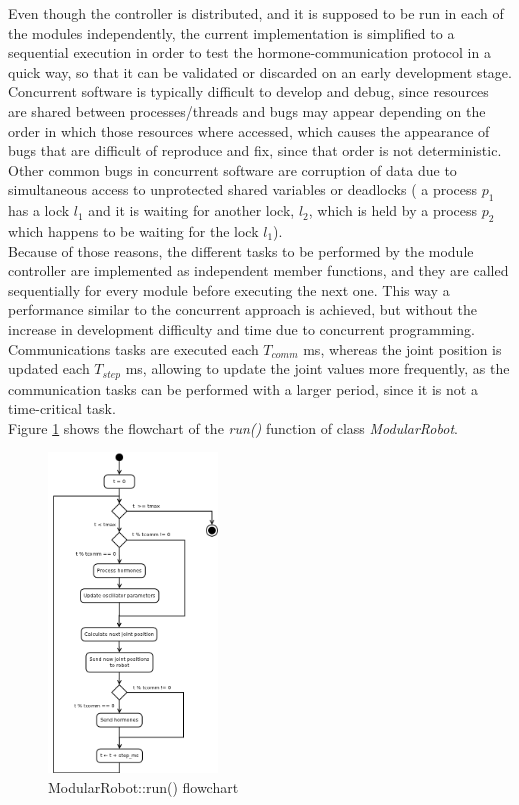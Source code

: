 Even though the controller is distributed, and it is supposed to be run in each of the modules independently, the current implementation is simplified to a sequential execution in order to test the hormone-communication protocol in a quick way, so that it can be validated or discarded on an early development stage. Concurrent software is typically difficult to develop and debug, since resources are shared between processes/threads and bugs may appear depending on the order in which those resources where accessed, which causes the appearance of bugs that are difficult of reproduce and fix, since that order is not deterministic. Other common bugs in concurrent software are corruption of data due to simultaneous access to unprotected shared variables or deadlocks ( a process $p_1$ has a lock $l_1$ and it is waiting for another lock, $l_2$, which is held by a process $p_2$ which happens to be waiting for the lock $l_1$).\\

Because of those reasons, the different tasks to be performed by the module controller are implemented as independent member functions, and they are called sequentially for every module before executing the next one. This way a performance similar to the concurrent approach is achieved, but without the increase in development difficulty and time due to concurrent programming. Communications tasks are executed each $T_{comm}$ ms, whereas the joint position is updated each $T_{step}$ ms, allowing to update the joint values more frequently, as the communication tasks can be performed with a larger period, since it is not a time-critical task.\\

Figure \ref{fig:software_class_modularrobot_flowchart} shows the flowchart of the \emph{run()} function of class \emph{ModularRobot}.\\

\begin{figure}[h]
		\centering
        \includegraphics[width=0.4\textwidth]{images/Flowchart_ModularRobot_run.png}
        \caption{ModularRobot::run() flowchart}\label{fig:software_class_modularrobot_flowchart}
\end{figure}

